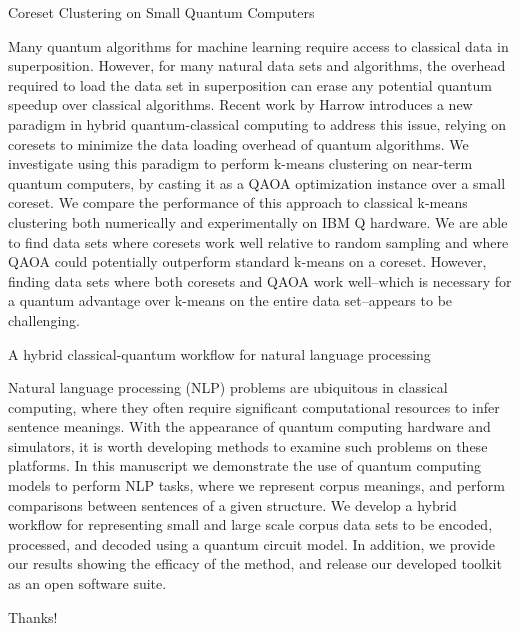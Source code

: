 \documentclass[
  ignorenonframetext,
]{beamer}
\newif\ifbibliography
\begin{document}
\begin{frame}{Coreset Clustering on Small Quantum Computers
\cite{tomesh2020coreset}}
\protect\hypertarget{coreset-clustering-on-small-quantum-computers}{}
\begin{small}
Many quantum algorithms for machine learning require access to classical data in superposition. However, for many natural data sets and algorithms, the overhead required to load the data set in superposition can erase any potential quantum speedup over classical algorithms. Recent work by Harrow introduces a new paradigm in hybrid quantum-classical computing to address this issue, relying on coresets to minimize the data loading overhead of quantum algorithms. We investigate using this paradigm to perform k-means clustering on near-term quantum computers, by casting it as a QAOA optimization instance over a small coreset. We compare the performance of this approach to classical k-means clustering both numerically and experimentally on IBM Q hardware. We are able to find data sets where coresets work well relative to random sampling and where QAOA could potentially outperform standard k-means on a coreset. However, finding data sets where both coresets and QAOA work well--which is necessary for a quantum advantage over k-means on the entire data set--appears to be challenging.

\end{small}
\end{frame}

\begin{frame}{A hybrid classical-quantum workflow for natural language
processing \cite{ORiordan2020AHC}}
\protect\hypertarget{a-hybrid-classical-quantum-workflow-for-natural-language-processing}{}
\begin{small}
Natural language processing (NLP) problems are ubiquitous in classical computing, where they often require significant computational resources to infer sentence meanings. With the appearance of quantum computing hardware and simulators, it is worth developing methods to examine such problems on these platforms. In this manuscript we demonstrate the use of quantum computing models to perform NLP tasks, where we represent corpus meanings, and perform comparisons between sentences of a given structure. We develop a hybrid workflow for representing small and large scale corpus data sets to be encoded, processed, and decoded using a quantum circuit model. In addition, we provide our results showing the efficacy of the method, and release our developed toolkit as an open software suite.

\end{small}
\end{frame}

\begin{frame}{}
\protect\hypertarget{section-6}{}
\begin{Huge}
Thanks!
\end{Huge}
\end{frame}

\begin{frame}[allowframebreaks]{}
  \bibliographytrue
  \printbibliography[heading=none]
\end{frame}
\end{document}
